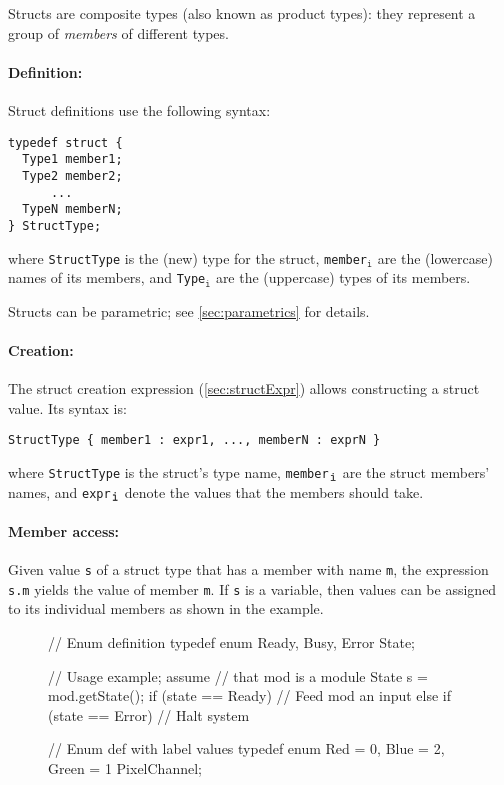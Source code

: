 Structs are composite types (also known as product types):
they represent a group of \emph{members} of different types.

\paragraph{Definition:} Struct definitions use the following syntax:
\begin{center}
\verb|typedef struct {| \\
\verb|  Type1 member1;| \\
\verb|  Type2 member2;| \\
\verb|      ...       | \\
\verb|  TypeN memberN;| \\
\verb|} StructType;   |
\end{center}
where \verb|StructType| is the (new) type for the struct,
\verb|member|$_{\texttt{i}}$ are the (lowercase) names of its members, and
\verb|Type|$_{\texttt{i}}$ are the (uppercase) types of its members.

Structs can be parametric; see \autoref{sec:parametrics} for details.

\paragraph{Creation:} The struct creation expression (\autoref{sec:structExpr}) allows constructing a struct value.
Its syntax is:
\begin{center}
  \verb|StructType { member1 : expr1, ..., memberN : exprN }|
\end{center}
where \verb|StructType| is the struct's type name, \verb|member|$_{\verb|i|}$ are the struct members' names,
and \verb|expr|$_{\verb|i|}$ denote the values that the members should take.

\paragraph{Member access:} Given value \verb|s| of a struct type that has a member with name \verb|m|,
the expression \verb|s.m| yields the value of member \verb|m|.
If \verb|s| is a variable, then values can be assigned to its individual members as shown in the example.

\begin{wrapfigure}{r}{0.32\columnwidth}
\vspace{-3.5em}
\begin{mscode}
// Enum definition
typedef enum {
  Ready, Busy, Error
} State;

// Usage example; assume
// that mod is a module
State s = mod.getState();
if (state == Ready)
  // Feed mod an input
else if (state == Error)
  // Halt system

// Enum def with label values
typedef enum {
 Red = 0, Blue = 2, Green = 1
} PixelChannel;
\end{mscode}
\vspace{-5em}
\end{wrapfigure}

